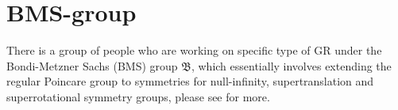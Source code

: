 \documentclass[a4paper, 12pt]{article}
\begin{document}
   \section{BMS-group}%
    \label{sec:MBNS-group}
    There is a group of people who are working on specific type of
    GR under the Bondi-Metzner Sachs (BMS) group \( \mathfrak{B} \), which
    essentially involves extending the regular Poincare group 
    to symmetries for null-infinity, supertranslation and
    superrotational symmetry groups, please see
    \cite{ashtekar2018null} for more.  

    \newpage



        
\end{document}
